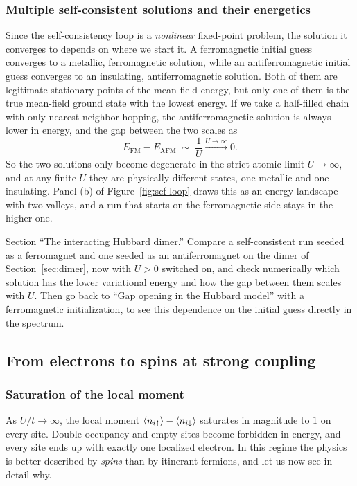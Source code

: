\documentclass[lecture_notes.tex]{subfiles}
\begin{document}
\subsubsection{Multiple self-consistent solutions and their energetics}
Since the self-consistency loop is a \emph{nonlinear} fixed-point problem, the solution it
converges to depends on where we start it. A ferromagnetic initial guess converges to a
metallic, ferromagnetic solution, while an antiferromagnetic initial guess converges to an
insulating, antiferromagnetic solution. Both of them are legitimate stationary points of the
mean-field energy, but only one of them is the true mean-field ground state with the lowest
energy. If we take a half-filled chain with only nearest-neighbor hopping, the antiferromagnetic
solution is always lower in energy, and the gap between the two scales as
\begin{equation}
  E_{\mathrm{FM}} - E_{\mathrm{AFM}} \;\sim\; \frac{1}{U} \xrightarrow{U\to\infty} 0.
\end{equation}
So the two solutions only become degenerate in the strict atomic limit $U\to\infty$, and at any
finite $U$ they are physically different states, one metallic and one insulating. Panel (b) of
Figure~\ref{fig:scf-loop} draws this as an energy landscape with two valleys, and a run that
starts on the ferromagnetic side stays in the higher one.

\begin{notebook}
Section ``The interacting Hubbard dimer.'' Compare a self-consistent run seeded as a ferromagnet
and one seeded as an antiferromagnet on the dimer of Section~\ref{sec:dimer}, now with
$U>0$ switched on, and check numerically which solution has the lower variational energy and how
the gap between them scales with $U$. Then go back to ``Gap opening in the Hubbard
model'' with a ferromagnetic initialization, to see this dependence on the initial guess directly
in the spectrum.
\end{notebook}

\subsection{From electrons to spins at strong coupling}
\label{sec:strongcoupling}
\subsubsection{Saturation of the local moment}
As $U/t \to \infty$, the local moment $\expval{n_{i\uparrow}} -
\expval{n_{i\downarrow}}$ saturates in magnitude to $1$ on every site. Double occupancy and empty sites
become forbidden in energy, and every site ends up with exactly one localized electron. In this
regime the physics is better described by \emph{spins} than by itinerant fermions, and let us now
see in detail why.
\end{document}
